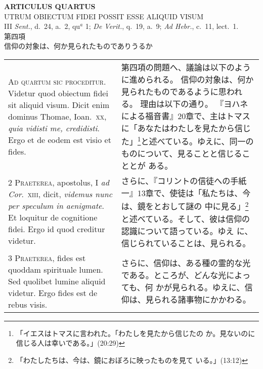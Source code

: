 \documentclass[10pt]{jsarticle} %
\begin{document}
\begin{center}
 {\Large {\bf ARTICULUS QUARTUS}}\\
 {\large UTRUM OBIECTUM FIDEI POSSIT ESSE ALIQUID VISUM}\\
 {\footnotesize III {\itshape Sent.}, d.~24, a.~2, qu$^a$ 1; {\itshape
 De Verit.}, q.~19, a.~9; {\itshape Ad Hebr.}, c.~11, lect.~1.}\\
 {\Large 第四項\\信仰の対象は、何か見られたものでありうるか}
\end{center}

\begin{longtable}{p{21em}p{21em}}


{\huge A}{\scshape d quartum sic proceditur}. Videtur quod obiectum
fidei sit aliquid visum. Dicit enim dominus Thomae, Ioan.~{\scshape xx},
{\itshape quia vidisti me, credidisti}. Ergo et de eodem est visio et
fides.

&

第四項の問題へ、議論は以下のように進められる。
信仰の対象は、何か見られたものであるように思われる。
理由は以下の通り。
『ヨハネによる福音書』20章で、主はトマスに「あなたはわたしを見たから信じ
 た」\footnote{「イエスはトマスに言われた。「わたしを見たから信じたの
 か。見ないのに信じる人は幸いである。」(20:29)}と述べている。ゆえに、同一のものについて、見ることと信じることとが
 ある。

\\


{\scshape 2 Praeterea}, apostolus, I {\itshape ad Cor}.~{\scshape xiii},
dicit, {\itshape videmus nunc per speculum in aenigmate}. Et loquitur de
cognitione fidei. Ergo id quod creditur videtur.

&

さらに、『コリントの信徒への手紙一』13章で、使徒は「私たちは、今は、鏡をとおして謎の
 中に見る」\footnote{「わたしたちは、今は、鏡におぼろに映ったものを見て
 いる。」(13:12)}と述べている。そして、彼は信仰の認識について語っている。ゆえ
 に、信じられていることは、見られる。

\\


{\scshape 3 Praeterea}, fides est quoddam spirituale lumen. Sed quolibet
lumine aliquid videtur. Ergo fides est de rebus visis.

&

さらに、信仰は、ある種の霊的な光である。ところが、どんな光によっても、何
 かが見られる。ゆえに、信仰は、見られる諸事物にかかわる。


\end{longtable}
\end{document}
